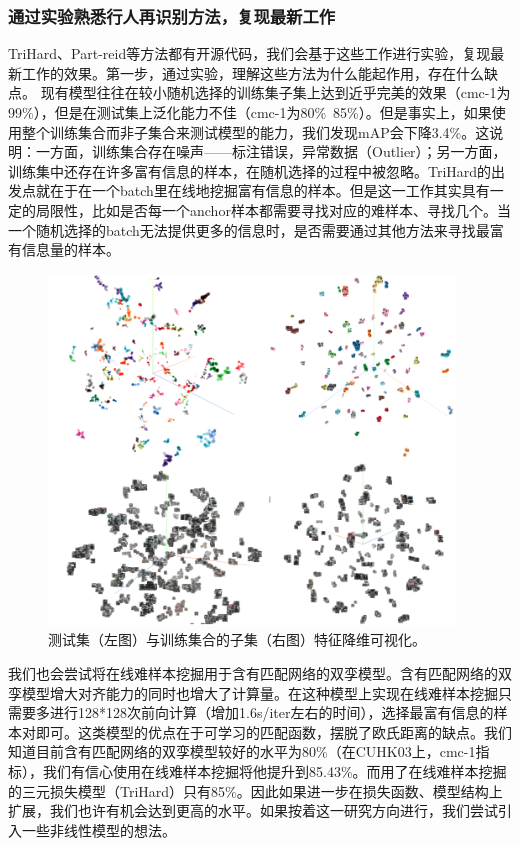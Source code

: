 \subsubsection{通过实验熟悉行人再识别方法，复现最新工作}

TriHard、Part-reid等方法都有开源代码，我们会基于这些工作进行实验，复现最新工作的效果。第一步，通过实验，理解这些方法为什么能起作用，存在什么缺点。
现有模型往往在较小随机选择的训练集子集上达到近乎完美的效果（cmc-1为99\%），但是在测试集上泛化能力不佳（cmc-1为80\%~85\%）。但是事实上，如果使用整个训练集合而非子集合来测试模型的能力，我们发现mAP会下降3.4\%。这说明：一方面，训练集合存在噪声——标注错误，异常数据（Outlier）；另一方面，训练集中还存在许多富有信息的样本，在随机选择的过程中被忽略。TriHard的出发点就在于在一个batch里在线地挖掘富有信息的样本。但是这一工作其实具有一定的局限性，比如是否每一个anchor样本都需要寻找对应的难样本、寻找几个。当一个随机选择的batch无法提供更多的信息时，是否需要通过其他方法来寻找最富有信息量的样本。

\begin{figure}
	\centering
	\captionsetup{width=.88\linewidth}
	\includegraphics[width=.75\linewidth,keepaspectratio]{data/kaitibaogao/vis2.png}
	\caption{\kaiti 测试集（左图）与训练集合的子集（右图）特征降维可视化。}
	\label{figure:vis2}
\end{figure}

我们也会尝试将在线难样本挖掘用于含有匹配网络的双孪模型。含有匹配网络的双孪模型增大对齐能力的同时也增大了计算量。在这种模型上实现在线难样本挖掘只需要多进行128*128次前向计算（增加1.6s/iter左右的时间），选择最富有信息的样本对即可。这类模型的优点在于可学习的匹配函数，摆脱了欧氏距离的缺点。我们知道目前含有匹配网络的双孪模型较好的水平为80\%（在CUHK03上，cmc-1指标），我们有信心使用在线难样本挖掘将他提升到85.43\%。而用了在线难样本挖掘的三元损失模型（TriHard）只有85\%。因此如果进一步在损失函数、模型结构上扩展，我们也许有机会达到更高的水平。如果按着这一研究方向进行，我们尝试引入一些非线性模型的想法。

